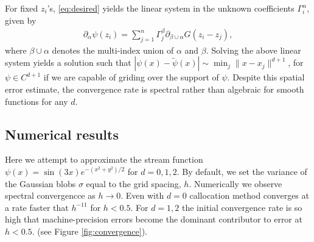 \documentclass[12pt]{amsart}
\begin{document}
For fixed $z_i$'s, \eqref{eq:desired} yields the linear system in the unknown coefficients $\Gamma_i^\alpha$, given by
\begin{align*}
  \partial_{\alpha} \psi(z_i) = \sum_{j=1}^{n} \Gamma_j^\beta \partial_{\beta \cup \alpha}G(z_i-z_j),
\end{align*}
where $\beta \cup \alpha$ denotes the multi-index union of $\alpha$ and $\beta$.
Solving the above linear system yields a solution such that $|\psi(x) - \tilde{\psi}(x)| \sim \min_j \|x-x_j\|^{d+1}$, for $\psi \in C^{d+1}$ if we are capable of griding over the support of $\psi$.
Despite this spatial error estimate, the convergence rate is spectral rather than algebraic for smooth functions for any $d$.

\subsection{Numerical results}
Here we attempt to approximate the stream function
$\psi(x) = \sin(3x) e^{ -(x^2+y^2)/2}$
for $d = 0,1,2$.
By default, we set the variance of the Gaussian blobs $\sigma$ equal to 
the grid spacing, $h$.
Numerically we observe spectral convergencce as $h \to 0$.
Even with $d=0$ callocation method converges at a rate faster that $h^{-11}$ 
for $h < 0.5$.
For $d=1,2$ the initial convergence rate is so high
that machine-precision errors become the dominant contributor to error 
at $h < 0.5$.
(see Figure \ref{fig:convergence}).
\end{document}
